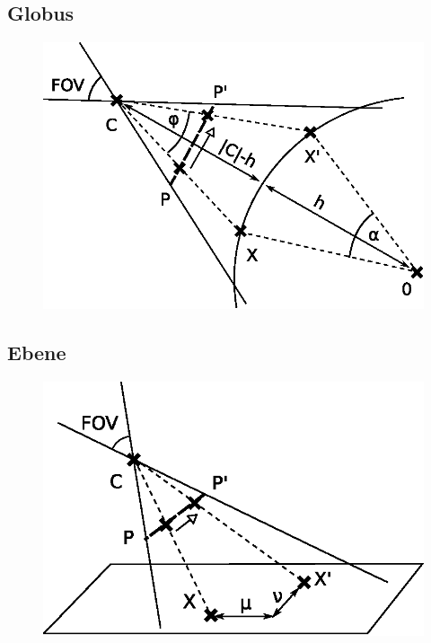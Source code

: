 \documentclass[10pt]{scrreprt}
\begin{document}
\subsection*{Globus}
\begin{figure}[!htb]
\includegraphics[scale=0.75]{algo/MausKugel.eps}
\end{figure}

\subsection*{Ebene}
\begin{figure}[!htb]
\includegraphics[scale=0.75]{algo/MausEbene.eps}
\end{figure}
\end{document}

